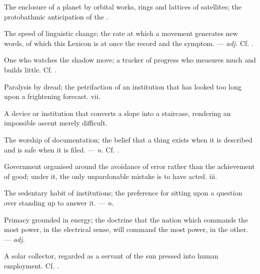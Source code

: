  The enclosure of a planet by orbital works, rings and lattices of satellites; the protobathmic anticipation of the .

 The speed of linguistic change; the rate at which a movement generates new words, of which this Lexicon is at once the record and the symptom. ---  \textit{adj.} Cf. .

 One who watches the shadow move; a tracker of progress who measures much and builds little. Cf. .

 Paralysis by dread; the petrifaction of an institution that has looked too long upon a frightening forecast.   vii.

 A device or institution that converts a slope into a staircase, rendering an impossible ascent merely difficult. 

 The worship of documentation; the belief that a thing exists when it is described and is safe when it is filed. ---  \textit{n.} Cf. .

 Government organised around the avoidance of error rather than the achievement of good; under it, the only unpardonable mistake is to have acted.   iii.

 The sedentary habit of institutions; the preference for sitting upon a question over standing up to answer it. ---  \textit{n.}

 Primacy grounded in energy; the doctrine that the nation which commands the most power, in the electrical sense, will command the most power, in the other. ---  \textit{adj.}

 A solar collector, regarded as a servant of the sun pressed into human employment.  Cf. .

